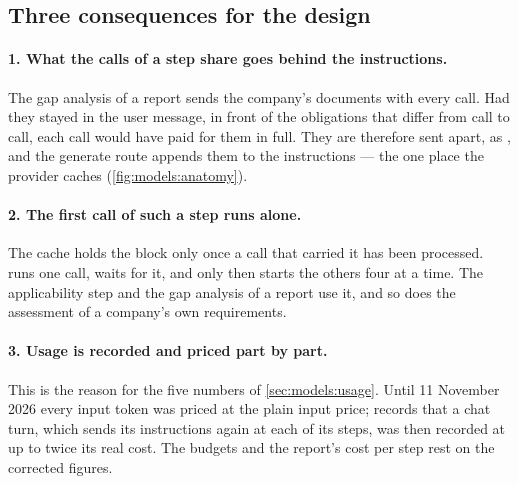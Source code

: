 \subsection{Three consequences for the design}

\paragraph{1. What the calls of a step share goes behind the instructions.} The gap analysis
of a report sends the company's documents with every call. Had they stayed in the user
message, in front of the obligations that differ from call to call, each call would have paid
for them in full. They are therefore sent apart, as , and the generate route
appends them to the instructions --- the one place the provider caches
(\cref{fig:models:anatomy}).

\paragraph{2. The first call of such a step runs alone.} The cache holds the block only once
a call that carried it has been processed.  runs one call, waits for it,
and only then starts the others four at a time. The applicability step and the gap analysis
of a report use it, and so does the assessment of a company's own requirements.

\paragraph{3. Usage is recorded and priced part by part.} This is the reason for the five
numbers of \cref{sec:models:usage}. Until 11 November 2026 every input token was priced at
the plain input price;  records that a chat turn, which sends its
instructions again at each of its steps, was then recorded at up to twice its real cost. The
budgets and the report's cost per step rest on the corrected figures.


